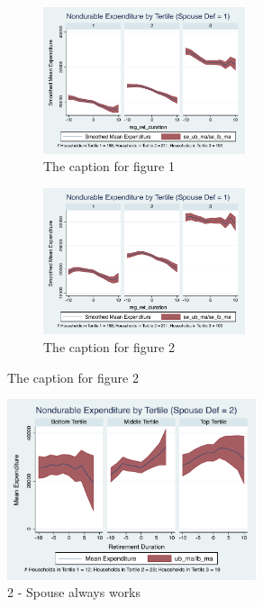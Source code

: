 \documentclass[11pt,onecolumn]{article}
\numberwithin{figure}{section}
\begin{document}
\begin{figure}
  \begin{subfigure}{0.6\linewidth}
    \centering
 	\includegraphics[width=0.65\textwidth]{../ConsumptionPostRetirement_by_SpouseDef/Smoothed_xhealth/spouse_def_1.pdf}
    \caption{The caption for figure 1}
    \label{fig:chapter001_dist_001}
  \end{subfigure} %
  \quad
  \begin{subfigure}{0.6\textwidth}
    \centering
 	\includegraphics[width=0.65\textwidth]{../ConsumptionPostRetirement_by_SpouseDef/Smoothed_xhealth_educ/spouse_def_1.pdf}
    \caption{The caption for figure 2}
    \label{fig:chapter001_reward_001}
  \end{subfigure}
\end{figure}
\clearpage
\begin{figure}[h]
	\caption{2 - Spouse always works}
	\centering
	\includegraphics[width=0.65\textwidth]{../ConsumptionPostRetirement_by_SpouseDef/Smoothed/spouse_def_2.pdf}
\end{figure}
\end{document}
